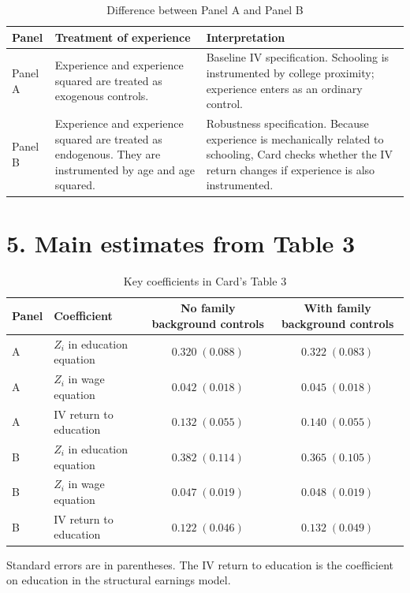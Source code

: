 \documentclass[11pt,a4paper]{article}
\begin{document}
\begin{table}[h!]
\centering
\caption{Difference between Panel A and Panel B}
\begin{tabular}{>{\raggedright\arraybackslash}p{3.0cm}
                >{\raggedright\arraybackslash}p{5.3cm}
                >{\raggedright\arraybackslash}p{5.3cm}}
\toprule
Panel & Treatment of experience & Interpretation \\
\midrule
Panel A & Experience and experience squared are treated as exogenous controls. & Baseline IV specification. Schooling is instrumented by college proximity; experience enters as an ordinary control. \\
Panel B & Experience and experience squared are treated as endogenous. They are instrumented by age and age squared. & Robustness specification. Because experience is mechanically related to schooling, Card checks whether the IV return changes if experience is also instrumented. \\
\bottomrule
\end{tabular}
\end{table}

\section*{5. Main estimates from Table 3}

\begin{table}[h!]
\centering
\begin{threeparttable}
\caption{Key coefficients in Card's Table 3}
\begin{tabular}{llcc}
\toprule
Panel & Coefficient & No family background controls & With family background controls \\
\midrule
A & \(Z_i\) in education equation & \(0.320\;(0.088)\) & \(0.322\;(0.083)\) \\
A & \(Z_i\) in wage equation & \(0.042\;(0.018)\) & \(0.045\;(0.018)\) \\
A & IV return to education & \(0.132\;(0.055)\) & \(0.140\;(0.055)\) \\
\midrule
B & \(Z_i\) in education equation & \(0.382\;(0.114)\) & \(0.365\;(0.105)\) \\
B & \(Z_i\) in wage equation & \(0.047\;(0.019)\) & \(0.048\;(0.019)\) \\
B & IV return to education & \(0.122\;(0.046)\) & \(0.132\;(0.049)\) \\
\bottomrule
\end{tabular}
\begin{tablenotes}
\small
\item Standard errors are in parentheses. The IV return to education is the coefficient on education in the structural earnings model.
\end{tablenotes}
\end{threeparttable}
\end{table}
\end{document}
